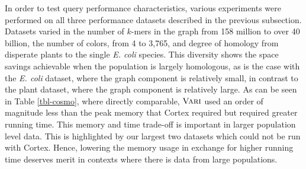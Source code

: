 
In order to test query performance characteristics, various experiments were performed on all three performance datasets described in the previous subsection.  Datasets varied in the number of $k$-mers in the graph from 158 million to over 40 billion, the number of colors, from 4 to 3,765, and degree of homology from disperate plants to the single \emph{E. coli} species.  This diversity shows the space savings achievable when the population is largely homologous, as is the case with the \emph{E. coli} dataset, where the graph component is relatively small, in contrast to the plant dataset, where the graph component is relatively large. As can be seen in Table \ref{tbl-cosmo}, where directly comparable, $\mbox{\rm {\sc Vari}}$ used an order of magnitude less than the peak memory that {\sc Cortex}  required but required greater running time.  This memory and time trade-off is important in larger population level data.  %
This is highlighted by our largest two datasets which could not be run with {\sc Cortex}.
Hence, lowering the memory usage in exchange for higher running time deserves merit in contexts where there is data from large populations. 
 


